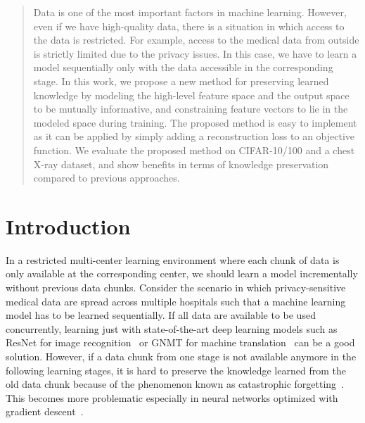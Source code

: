 \documentclass[runningheads,a4paper]{llncs}
\newcommand{\keywords}[1]{\par\addvspace\baselineskip
\noindent\keywordname\enspace\ignorespaces#1}
\begin{document}
\begin{abstract}
Data is one of the most important factors in machine learning. However, even if we have high-quality data, there is a situation in which access to the data is restricted. For example, access to the medical data from outside is strictly limited due to the privacy issues. In this case, we have to learn a model sequentially only with the data accessible in the corresponding stage. In this work, we propose a new method for preserving learned knowledge by modeling the high-level feature space and the output space to be mutually informative, and constraining feature vectors to lie in the modeled space during training. The proposed method is easy to implement as it can be applied by simply adding a reconstruction loss to an objective function. We evaluate the proposed method on CIFAR-10/100 and a chest X-ray dataset, and show benefits in terms of knowledge preservation compared to previous approaches.
\end{abstract}


\section{Introduction}

In a restricted multi-center learning environment where each chunk of data is only available at the corresponding center, we should learn a model incrementally without previous data chunks. Consider the scenario in which privacy-sensitive medical data are spread across multiple hospitals such that a machine learning model has to be learned sequentially.
If all data are available to be used concurrently, learning just with state-of-the-art deep learning models such as ResNet for image recognition~\cite{r07_resnet_cvpr2016} or GNMT for machine translation~\cite{r08_gnmt_arxiv2016} can be a good solution. However, if a data chunk from one stage is not available anymore in the following learning stages, it is hard to preserve the knowledge learned from the old data chunk because of the phenomenon known as catastrophic forgetting~\cite{r02_catastrophic_iclr2014}. This becomes more problematic especially in neural networks optimized with gradient descent~\cite{r01_catastrophic_psy1989}.
\end{document}
